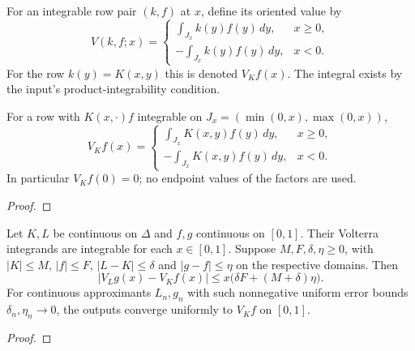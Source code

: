 \begin{definition}
\label{def:volterra-continuous-kernel}
\leanok
For an integrable row pair $(k,f)$ at $x$, define its oriented value by
\[
 V(k,f;x)=
 \begin{cases}
   \displaystyle\int_{J_x} k(y)f(y)\,dy,&x\ge0,\\
   \displaystyle-\int_{J_x} k(y)f(y)\,dy,&x<0.
 \end{cases}
\]
For the row $k(y)=K(x,y)$ this is denoted $V_Kf(x)$.
The integral exists by the input's product-integrability condition.
\end{definition}

\begin{supporting}
\begin{theorem}
\label{thm:volterra-integral-value}
\leanok
For a row with $K(x,\cdot)f$ integrable on
$J_x=(\min(0,x),\max(0,x))$,
\[
 V_Kf(x)=
 \begin{cases}
 \displaystyle\int_{J_x}K(x,y)f(y)\,dy,&x\ge0,\\
 \displaystyle-\int_{J_x}K(x,y)f(y)\,dy,&x<0.
 \end{cases}
\]
In particular $V_Kf(0)=0$; no endpoint values of the factors are used.
\end{theorem}
\begin{proof}
\leanok
\end{proof}

\begin{theorem}
\label{thm:volterra-approximation-stability}
\leanok
Let $K,L$ be continuous on $\Delta$ and $f,g$ continuous on $[0,1]$.
Their Volterra integrands are integrable for each $x\in[0,1]$.
Suppose $M,F,\delta,\eta\ge0$, with $|K|\le M$, $|f|\le F$,
$|L-K|\le\delta$ and $|g-f|\le\eta$ on the respective domains. Then
\[
 |V_Lg(x)-V_Kf(x)|\le x\bigl(\delta F+(M+\delta)\eta\bigr).
\]
For continuous approximants $L_n,g_n$ with such nonnegative uniform error bounds
$\delta_n,\eta_n\to0$, the outputs converge uniformly to $V_Kf$ on $[0,1]$.
\end{theorem}
\begin{proof}
\leanok
\end{proof}


\end{supporting}
